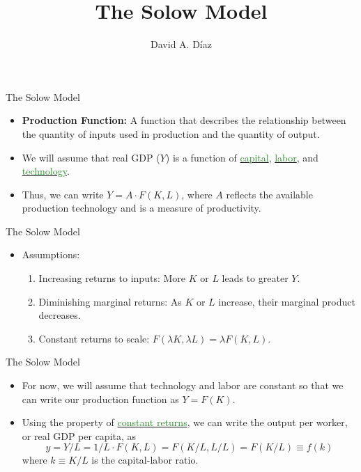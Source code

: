 \documentclass[xcolor={dvipsnames},pdf, hyperref={colorlinks=true, citecolor=ForestGreen, linkcolor=BlueViolet, urlcolor=Magenta}]{beamer}
\title{The Solow Model}
\author{David A. D\'iaz}
\institute{UNC Chapel Hill}
\date{}
\theoremstyle{definition}
\newcommand{\defn}[1]{\textbf{#1}}
\newcommand{\dd}[1]{{\underline{\textcolor{ForestGreen}{#1}}}}
\begin{document}
 
	
	\begin{frame}
		
		\titlepage
		
	\end{frame}


\begin{frame}{The Solow Model}
\begin{itemize}
	\item \defn{Production Function:} A function that describes the relationship between the quantity of inputs used in production and the quantity of output.
	\item We will assume that real GDP ($Y$) is a function of \dd{capital}, \dd{labor}, and \dd{technology}. 
	\item Thus, we can write $Y = A\cdot F(K,L)$, where $A$ reflects the available production technology and is a measure of productivity.
\end{itemize}
\end{frame}

\begin{frame}{The Solow Model}
\begin{itemize}
	\item Assumptions:
\begin{enumerate}
	\item Increasing returns to inputs: More $K$ or $L$ leads to greater $Y$.
	\item Diminishing marginal returns: As $K$ or $L$ increase, their marginal product decreases.
	\item Constant returns to scale: $F(\lambda K, \lambda L) = \lambda F(K,L)$.
\end{enumerate}

\end{itemize}
\end{frame}

\begin{frame}{The Solow Model}
\begin{itemize}	
	\item For now, we will assume that technology and labor are constant so that we can write our production function as $Y = F(K)$.
	\item Using the property of \dd{constant returns}, we can write the output per worker, or real GDP per capita, as 
	\[y = Y/L = 1/L \cdot F(K,L) = F(K/L,L/L) = F(K/L) \equiv f(k) \]
	where $k \equiv K/L$ is the capital-labor ratio.
\end{itemize}
\end{frame}
\end{document}
